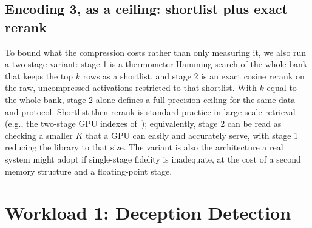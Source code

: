 \documentclass[conference]{IEEEtran}
\begin{document}
\subsection{Encoding 3, as a ceiling: shortlist plus exact rerank}
\label{subsec:TwoStage}
To bound what the compression costs rather than only measuring it, we
also run a two-stage variant: stage 1 is a thermometer-Hamming search of
the whole bank that keeps the top $k$ rows as a shortlist, and stage 2
is an exact cosine rerank on the raw, uncompressed activations
restricted to that shortlist. With $k$ equal to the whole bank, stage 2
alone defines a full-precision ceiling for the same data and protocol.
Shortlist-then-rerank is standard practice in large-scale retrieval
(e.g., the two-stage GPU indexes of~\cite{faisscuvs2025});
equivalently, stage 2 can be read as checking a smaller $K$ that a
GPU can easily and accurately serve, with stage 1 reducing the
library to that size. The variant is also the architecture a real
system might adopt if
single-stage fidelity is inadequate, at the cost of a second memory
structure and a floating-point stage.

\section{Workload 1: Deception Detection}
\label{sec:Results}
\end{document}
